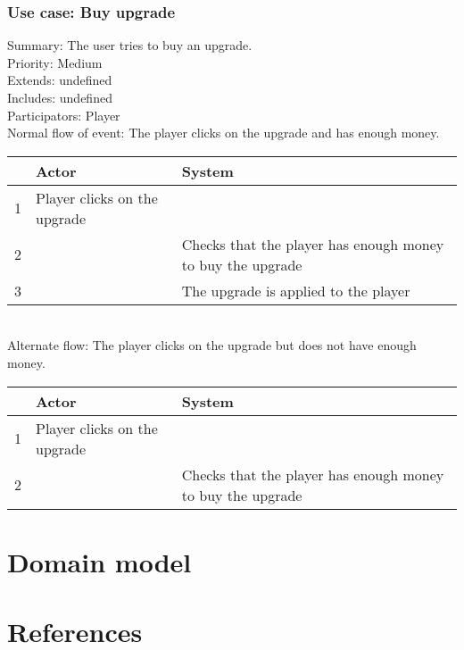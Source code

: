 \documentclass{article}
\begin{document}
\subsubsection{Use case: Buy upgrade}
Summary: The user tries to buy an upgrade.\\
Priority: Medium\\
Extends: undefined\\
Includes: undefined\\
Participators: Player\\
Normal flow of event: The player clicks on the upgrade and has enough money.\\
\begin{tabular}{|c|l|l|} \hline
      & Actor & System \\ \hline
    1 & Player clicks on the upgrade & \\ \hline
    2 & & Checks that the player has enough money to buy the upgrade \\ \hline
    3 & & The upgrade is applied to the player \\ \hline
\end{tabular}\\ 
Alternate flow: The player clicks on the upgrade but does not have enough money. \\
\begin{tabular}{|c|l|l|} \hline
      & Actor & System \\ \hline
    1 & Player clicks on the upgrade & \\ \hline
    2 & & Checks that the player has enough money to buy the upgrade \\ \hline
\end{tabular} 

    
\section{Domain model}

\section{References}
\end{document}
